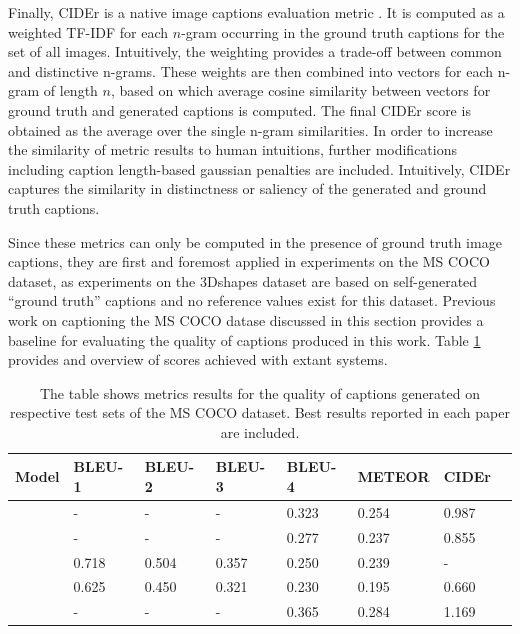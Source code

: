 Finally, CIDEr is a native image captions evaluation metric \parencite{vedantam2015cider}. It is computed as a weighted TF-IDF for each $n$-gram occurring in the ground truth captions for the set of all images. Intuitively, the weighting provides a trade-off between common and distinctive n-grams. These weights are then combined into vectors for each n-gram of length $n$, based on which average cosine similarity between vectors for ground truth and generated captions is computed. The final CIDEr score is obtained as the average over the single n-gram similarities. In order to increase the similarity of metric results to human intuitions, further modifications including caption length-based gaussian penalties are included. Intuitively, CIDEr captures the similarity in distinctness or saliency of the generated and ground truth captions.

Since these metrics can only be computed in the presence of ground truth image captions, they are first and foremost applied in experiments on the MS COCO dataset, as experiments on the 3Dshapes dataset are based on self-generated ``ground truth'' captions and no reference values exist for this dataset.
Previous work on captioning the MS COCO datase discussed in this section provides a baseline for evaluating the quality of captions produced in this work. Table \ref{tab_coco_metrics_ref} provides and overview of scores achieved with extant systems.

\begin{table}[]
	\begin{tabularx}{\textwidth}{|X|l|l|l|l|l|l|l|}
		\hline
		Model                               & BLEU-1 & BLEU-2 & BLEU-3 & BLEU-4 & METEOR & CIDEr \\ \hline
		\cite{bengio2015scheduled}        & -      & -      & -      & 0.323   & 0.254  & 0.987 \\ \hline
		\cite{vinyals2015show}  & -      & -      & -      & 0.277    & 0.237  & 0.855 \\ \hline
		\cite{xu2015show} & 0.718  & 0.504  & 0.357  & 0.250     & 0.239  & -     \\ \hline
		\cite{karpathy2015deep}          & 0.625  & 0.450  & 0.321  & 0.230   & 0.195  & 0.660 \\ \hline
		\cite{zhou2019unified}          & -  & -  & -  & 0.365   & 0.284  & 1.169 \pt{?} \\ \hline
	\end{tabularx}
\caption{\label{tab_coco_metrics_ref}The table shows metrics results for the quality of captions generated on respective test sets of the MS COCO dataset. Best results reported in each paper are included.}
\end{table}

